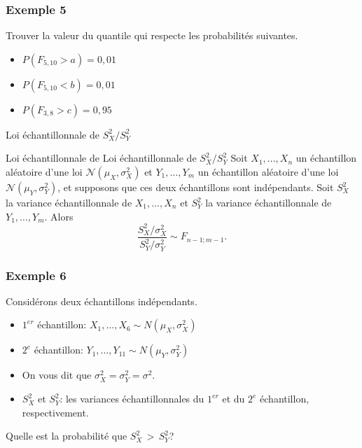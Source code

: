 \documentclass{BeamerTemplate}
\begin{document}
\begin{frame}[t]
 \frametitle{Exemple 5}

Trouver la valeur du quantile qui respecte les probabilités suivantes.
 \begin{itemize}
\item $P(F_{5,10}>a)=0,01$
\vspace{1cm}

\item $P(F_{5,10}<b)=0,01$

\vspace{2cm}
\item $P(F_{3,8}>c)=0,95$

\vspace{2cm}
\end{itemize}
\end{frame}


\begin{frame}{Loi échantillonnale de $S^2_X/S^2_Y$}

   \begin{Boite}{Loi échantillonnale de Loi échantillonnale de $S^2_X/S^2_Y$}
    Soit $X_1,\dots,X_{n}$ un échantillon aléatoire d'une loi $\mathcal{N}(\mu_X,\sigma_X^2)$
    et $Y_1,\dots,Y_{m}$ un échantillon aléatoire d'une loi $\mathcal{N}(\mu_Y,\sigma_Y^2)$,
    et supposons que ces deux échantillons sont indépendants. Soit $S^2_X$ la variance
    échantillonnale de $X_1,\dots,X_{n}$ et $S^2_Y$ la variance échantillonnale de $Y_1,\dots,Y_{m}$.
    Alors
    $$\frac{S^2_X/\sigma^2_X}{S^2_Y/\sigma^2_Y}\sim F_{n-1;m-1}.$$
\end{Boite}
 
\end{frame}



\begin{frame}[t]
 \frametitle{Exemple 6}

 {\small
Considérons deux échantillons indépendants.
\begin{itemize}
\item $1^{er}$ échantillon: $X_1,\ldots,X_6\sim N(\mu_X,\sigma_X^2)$ %
\item $2^e$ échantillon: $Y_1,\ldots,Y_{11}\sim N(\mu_Y,\sigma_Y^2)$ %
\item On vous dit que $\sigma^2_X=\sigma^2_Y=\sigma^2$.
\item $S^2_X$ et $S^2_Y$: les variances échantillonnales du $1^{er}$ et du $2^e$ échantillon, respectivement.
\end{itemize}

Quelle est la probabilité que $S^2_X \,>\,S^2_Y$?}

\end{frame}
\end{document}
